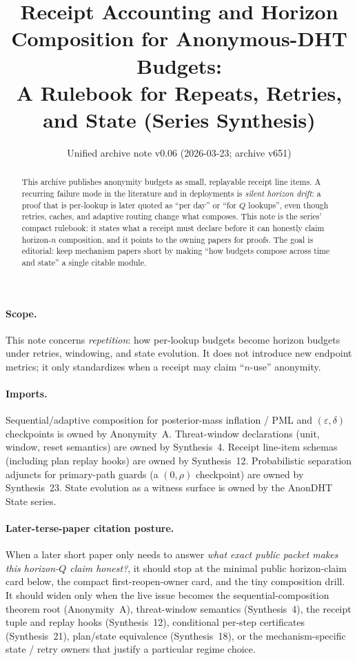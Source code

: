 \documentclass[11pt]{article}
\title{Receipt Accounting and Horizon Composition for Anonymous-DHT Budgets:\\
\large A Rulebook for Repeats, Retries, and State (Series Synthesis)}
\author{}
\date{Unified archive note v0.06 (2026-03-23; archive v651)}
\newcommand{\eps}{\varepsilon}
\begin{document}
\maketitle

\begin{abstract}
This archive publishes anonymity budgets as small, replayable receipt line items.
A recurring failure mode in the literature and in deployments is \emph{silent horizon drift}: a proof that is per-lookup is later quoted as ``per day'' or ``for $Q$ lookups'', even though retries, caches, and adaptive routing change what composes.
This note is the series' compact rulebook: it states what a receipt must declare before it can honestly claim horizon-$n$ composition, and it points to the owning papers for proofs.
The goal is editorial: keep mechanism papers short by making ``how budgets compose across time and state'' a single citable module.
\end{abstract}

\paragraph{Scope.}
This note concerns \emph{repetition}: how per-lookup budgets become horizon budgets under retries, windowing, and state evolution.
It does not introduce new endpoint metrics; it only standardizes when a receipt may claim ``$n$-use'' anonymity.

\paragraph{Imports.}
Sequential/adaptive composition for posterior-mass inflation / PML and $(\eps,\delta)$ checkpoints is owned by Anonymity~A.\cite{series:oddsinflation}
Threat-window declarations (unit, window, reset semantics) are owned by Synthesis~4.\cite{series:threatwindows}
Receipt line-item schemas (including plan replay hooks) are owned by Synthesis~12.\cite{series:receiptitems}
Probabilistic separation adjuncts for primary-path guards (a $(0,\rho)$ checkpoint) are owned by Synthesis~23.\cite{series:probsep}
State evolution as a witness surface is owned by the AnonDHT State series.\cite{series:state1}

\paragraph{Later-terse-paper citation posture.}
When a later short paper only needs to answer \emph{what exact public packet makes this horizon-$Q$ claim honest?}, it should stop at the minimal public horizon-claim card below, the compact first-reopen-owner card, and the tiny composition drill.
It should widen only when the live issue becomes the sequential-composition theorem root (Anonymity~A), threat-window semantics (Synthesis~4), the receipt tuple and replay hooks (Synthesis~12), conditional per-step certificates (Synthesis~21), plan/state equivalence (Synthesis~18), or the mechanism-specific state / retry owners that justify a particular regime choice.\cite{series:oddsinflation,series:threatwindows,series:receiptitems,series:condcert,series:planstateequiv,series:operationalA,series:operationalB,series:state1}
\end{document}
